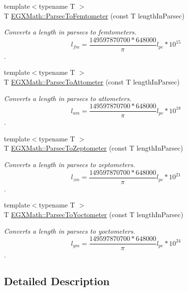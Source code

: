 \begin{DoxyCompactItemize}
{\footnotesize template$<$typename T $>$ }\\T \mbox{\hyperlink{group___e_g_x_math-_conversions-_length_conversions-_astronomical-_parsec-_s_i_ga6b6fd844f1af67b873c629f579a8b9ec}{E\+G\+X\+Math\+::\+Parsec\+To\+Femtometer}} (const T length\+In\+Parsec)
\begin{DoxyCompactList}\small\item\em Converts a length in parsecs to femtometers. \[ l_{fm}=\frac{149597870700 * 648000}{\pi}l_{pc} * 10^{15} \]. \end{DoxyCompactList}\item 
{\footnotesize template$<$typename T $>$ }\\T \mbox{\hyperlink{group___e_g_x_math-_conversions-_length_conversions-_astronomical-_parsec-_s_i_ga235c67c3c7b55d4ec553df3e1f435fbd}{E\+G\+X\+Math\+::\+Parsec\+To\+Attometer}} (const T length\+In\+Parsec)
\begin{DoxyCompactList}\small\item\em Converts a length in parsecs to attometers. \[ l_{am}=\frac{149597870700 * 648000}{\pi}l_{pc} * 10^{18} \]. \end{DoxyCompactList}\item 
{\footnotesize template$<$typename T $>$ }\\T \mbox{\hyperlink{group___e_g_x_math-_conversions-_length_conversions-_astronomical-_parsec-_s_i_ga3334cc4dbcddb1ae43e821f518bb56cb}{E\+G\+X\+Math\+::\+Parsec\+To\+Zeptometer}} (const T length\+In\+Parsec)
\begin{DoxyCompactList}\small\item\em Converts a length in parsecs to zeptometers. \[ l_{zm}=\frac{149597870700 * 648000}{\pi}l_{pc} * 10^{21} \]. \end{DoxyCompactList}\item 
{\footnotesize template$<$typename T $>$ }\\T \mbox{\hyperlink{group___e_g_x_math-_conversions-_length_conversions-_astronomical-_parsec-_s_i_ga2c745c68a73ead9c11af6bc86ce3e3f6}{E\+G\+X\+Math\+::\+Parsec\+To\+Yoctometer}} (const T length\+In\+Parsec)
\begin{DoxyCompactList}\small\item\em Converts a length in parsecs to yoctometers. \[ l_{ym}=\frac{149597870700 * 648000}{\pi}l_{pc} * 10^{24} \]. \end{DoxyCompactList}\end{DoxyCompactItemize}


\subsection{Detailed Description}


